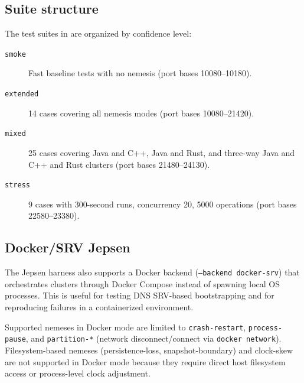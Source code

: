 \subsection{Suite structure}

The test suites in  are organized by confidence level:

\begin{description}
\item[\texttt{smoke}] Fast baseline tests with no nemesis (port bases 10080--10180).
\item[\texttt{extended}] 14 cases covering all nemesis modes (port bases 10080--21420).
\item[\texttt{mixed}] 25 cases covering Java and C++, Java and Rust, and three-way
Java and C++ and Rust clusters (port bases 21480--24130).
\item[\texttt{stress}] 9 cases with 300-second runs, concurrency 20, 5000 operations
(port bases 22580--23380).
\end{description}

\subsection{Docker/SRV Jepsen}

The Jepsen harness also supports a Docker backend (\texttt{--backend docker-srv})
that orchestrates clusters through Docker Compose instead of spawning local
OS processes. This is useful for testing DNS SRV-based bootstrapping and for
reproducing failures in a containerized environment.

Supported nemeses in Docker mode are limited to \texttt{crash-restart},
\texttt{process-pause}, and \texttt{partition-*} (network disconnect/connect
via \texttt{docker network}). Filesystem-based nemeses (persistence-loss,
snapshot-boundary) and clock-skew are not supported in Docker mode because
they require direct host filesystem access or process-level clock adjustment.

